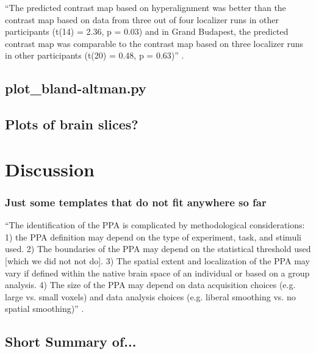 %
``The predicted contrast map based on hyperalignment was better than the
contrast map based on data from three out of four localizer runs in other
participants (t(14) = 2.36, p = 0.03) and in Grand Budapest, the predicted
contrast map was comparable to the contrast map based on three localizer runs in
other participants (t(20) = 0.48, p = 0.63)''
\citep{jiahui2020predicting}.


\subsection{plot\_bland-altman.py}



\subsection{Plots of brain slices?}






\section{Discussion}

\subsubsection{Just some templates that do not fit anywhere so far}


\citet{weiner2018defining} ``The identification of the PPA is complicated by
methodological considerations:
%
1) the PPA definition may depend on the type of experiment, task, and stimuli
used.
%
2) The boundaries of the PPA may depend on the statistical threshold used [which
we did not not do].
%
3) The spatial extent and localization of the PPA may vary if defined within the
native brain space of an individual or based on a group analysis.
%
4) The size of the PPA may depend on data acquisition choices (e.g. large vs.
small voxels) and data analysis choices (e.g. liberal smoothing vs. no spatial
smoothing)'' \citep{weiner2018defining}.


\subsection{Short Summary of...}

